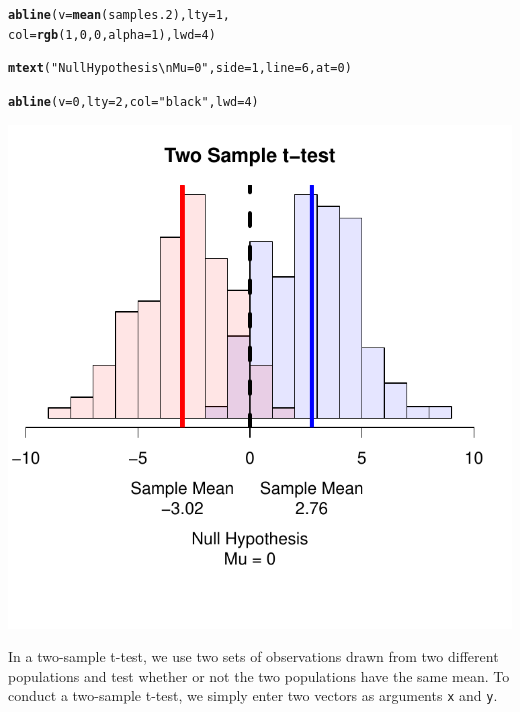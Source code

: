 \documentclass{tufte-book}\usepackage[]{graphicx}\usepackage[]{color}
\makeatletter
\def\maxwidth{ %
  \ifdim\Gin@nat@width>\linewidth
    \linewidth
  \else
    \Gin@nat@width
  \fi
}
\newcommand{\hlnum}[1]{\textcolor[rgb]{0.686,0.059,0.569}{#1}}%
\newcommand{\hlstr}[1]{\textcolor[rgb]{0.192,0.494,0.8}{#1}}%
\newcommand{\hlstd}[1]{\textcolor[rgb]{0.345,0.345,0.345}{#1}}%
\newcommand{\hlkwc}[1]{\textcolor[rgb]{0.333,0.667,0.333}{#1}}%
\newcommand{\hlkwd}[1]{\textcolor[rgb]{0.737,0.353,0.396}{\textbf{#1}}}%
\newenvironment{kframe}{%
 \def\at@end@of@kframe{}%
 \ifinner\ifhmode%
  \def\at@end@of@kframe{\end{minipage}}%
  \begin{minipage}{\columnwidth}%
 \fi\fi%
 \def\FrameCommand##1{\hskip\@totalleftmargin \hskip-\fboxsep
 \colorbox{shadecolor}{##1}\hskip-\fboxsep
     \hskip-\linewidth \hskip-\@totalleftmargin \hskip\columnwidth}%
 \MakeFramed {\advance\hsize-\width
   \@totalleftmargin\z@ \linewidth\hsize
   \@setminipage}}%
 {\par\unskip\endMakeFramed%
 \at@end@of@kframe}
\newenvironment{knitrout}{}{} %
\makeatother
\begin{document}
\begin{footnotesize}
\begin{marginfigure}
\begin{tiny}
\begin{knitrout}
\begin{kframe}
\begin{alltt}
\hlkwd{abline}\hlstd{(}\hlkwc{v} \hlstd{=} \hlkwd{mean}\hlstd{(samples.2),} \hlkwc{lty} \hlstd{=} \hlnum{1}\hlstd{,}
       \hlkwc{col} \hlstd{=} \hlkwd{rgb}\hlstd{(}\hlnum{1}\hlstd{,} \hlnum{0}\hlstd{,} \hlnum{0}\hlstd{,} \hlkwc{alpha} \hlstd{=} \hlnum{1}\hlstd{),} \hlkwc{lwd} \hlstd{=} \hlnum{4}\hlstd{)}

\hlkwd{mtext}\hlstd{(}\hlstr{"Null Hypothesis\textbackslash{}nMu = 0"}\hlstd{,} \hlkwc{side} \hlstd{=} \hlnum{1}\hlstd{,} \hlkwc{line} \hlstd{=} \hlnum{6}\hlstd{,} \hlkwc{at} \hlstd{=}\hlnum{0}\hlstd{)}

\hlkwd{abline}\hlstd{(}\hlkwc{v} \hlstd{=} \hlnum{0}\hlstd{,} \hlkwc{lty} \hlstd{=} \hlnum{2}\hlstd{,} \hlkwc{col} \hlstd{=} \hlstr{"black"}\hlstd{,} \hlkwc{lwd} \hlstd{=} \hlnum{4}\hlstd{)}
\end{alltt}
\end{kframe}
\includegraphics[width=\maxwidth]{figure/unnamed-chunk-223-1} 

\end{knitrout}
\end{tiny}
\end{marginfigure}

In a two-sample t-test, we use two sets of observations drawn from two different populations and test whether or not the two populations have the same mean. To conduct a two-sample t-test, we simply enter two vectors as arguments \texttt{x} and \texttt{y}. 


\end{footnotesize}
\end{document}
